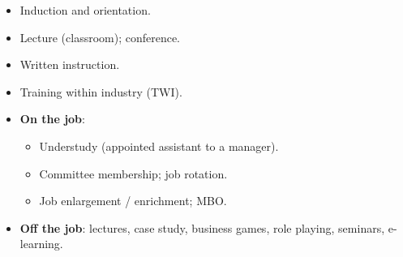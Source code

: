{\begin{itemize}
\end{itemize}
\begin{itemize}
  \item Induction and orientation.
  \item Lecture (classroom); conference.
  \item Written instruction.
  \item Training within industry (TWI).
\end{itemize}
\begin{itemize}
  \item \textbf{On the job}:
  \begin{itemize}
    \item Understudy (appointed assistant to a manager).
    \item Committee membership; job rotation.
    \item Job enlargement / enrichment; MBO.
  \end{itemize}
  \item \textbf{Off the job}: lectures, case study, business games, role playing,
    seminars, e-learning.
\end{itemize}}

